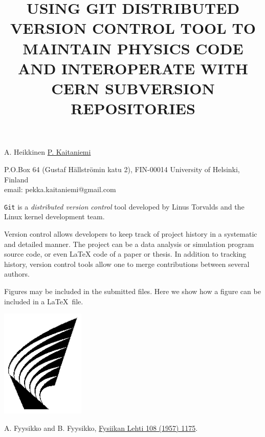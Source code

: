 \documentclass[12pt]{article}
\begin{document}
\title{USING GIT DISTRIBUTED VERSION CONTROL TOOL TO MAINTAIN PHYSICS
  CODE AND INTEROPERATE WITH CERN SUBVERSION REPOSITORIES}

A. Heikkinen \underline{P. Kaitaniemi}

P.O.Box 64 (Gustaf H\"allstr\"omin katu 2), FIN-00014 University of Helsinki, Finland\\
email: pekka.kaitaniemi@gmail.com

\vspace{\baselineskip}


{\tt Git} is a \emph{distributed version control} tool developed by
Linus Torvalds and the Linux kernel development team.

Version control allows developers to keep track of project history in
a systematic and detailed manner. The project can be a data analysis
or simulation program source code, or even LaTeX code of a paper or
thesis. In addition to tracking history, version control tools allow
one to merge contributions between several authors.


\begin{minipage}{9cm}
Figures may be included in the submitted files. Here we show how a
figure can be included in a \LaTeX\ file.
\end{minipage}
\hfill
\begin{minipage}{5cm}
\includegraphics[width=4cm]{logo.eps}
\end{minipage}


\begin{thebibliography}{9}

A. Fyysikko and B. Fyysikko,
\href{http://link.aps.org/abstract/PR/v108/p1175}{Fysiikan Lehti 108
(1957) 1175}.
\end{thebibliography}
\end{document}
